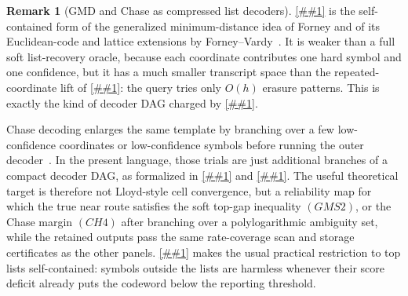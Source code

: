 \documentclass[10pt]{article}
\newcommand{\cref}[1]{\ref{##1}}
\newcommand{\Cref}[1]{\ref{##1}}
\theoremstyle{definition}
\newtheorem{remark}[theorem]{Remark}
\begin{document}
\begin{remark}[GMD and Chase as compressed list decoders]
   \label{rem:gmd-chase-compressed-decoder}
   \Cref{lem:reliability-erasure-sweep} is the self-contained form of the
   generalized minimum-distance idea of Forney and of its Euclidean-code and
   lattice extensions by Forney--Vardy~\cite{For66,FV96}.  It is weaker than a
   full soft list-recovery oracle, because each coordinate contributes one hard
   symbol and one confidence, but it has a much smaller transcript space than
   the repeated-coordinate lift of \cref{lem:hard-list-recovery-lift}: the
   query tries only \(O(h)\) erasure patterns.  This is exactly the kind of
   decoder DAG charged by
   \cref{cor:output-sensitive-decoder-dag-rate-coverage}.

   Chase decoding enlarges the same template by branching over a few
   low-confidence coordinates or low-confidence symbols before running the
   outer decoder~\cite{Cha72}.  In the present language, those trials are just
   additional branches of a compact decoder DAG, as formalized in
   \cref{lem:chase-gmd-reporter} and
   \cref{cor:chase-gmd-block-certificate}.  The useful theoretical target is
   therefore not Lloyd-style cell convergence, but a reliability map for which
   the true near route satisfies the soft top-gap inequality \((GMS2)\), or the
   Chase margin \((CH4)\) after branching over a polylogarithmic ambiguity set,
   while the retained outputs pass the same rate-coverage scan and storage
   certificates as the other panels.  \Cref{cor:top-list-chase-completeness}
   makes the usual practical restriction to top lists self-contained: symbols
   outside the lists are harmless whenever their score deficit already puts the
   codeword below the reporting threshold.


\end{remark}
\end{document}
